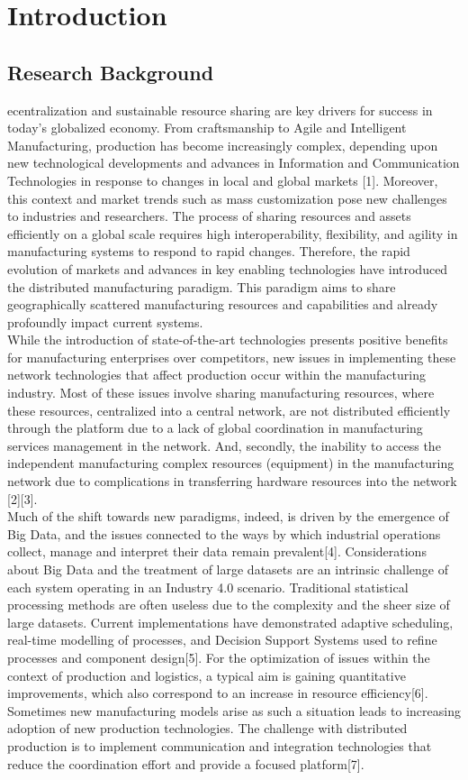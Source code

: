 \chapter*{Introduction}

\section{Research Background}
ecentralization and sustainable resource sharing are key drivers for success in today’s globalized economy. From craftsmanship to Agile and Intelligent Manufacturing, production has become increasingly complex, depending upon new technological developments and advances in Information and Communication Technologies in response to changes in local and global markets [1]. Moreover, this context and market trends such as mass customization pose new challenges to industries and researchers. The process of sharing resources and assets efficiently on a global scale requires high interoperability, flexibility, and agility in manufacturing systems to respond to rapid changes. Therefore, the rapid evolution of markets and advances in key enabling technologies have introduced the distributed manufacturing paradigm. This paradigm aims to share geographically scattered manufacturing resources and capabilities and already profoundly impact current systems.\\
While the introduction of state-of-the-art technologies presents positive benefits for manufacturing enterprises over competitors, new issues in implementing these network technologies that affect production occur within the manufacturing industry. Most of these issues involve sharing manufacturing resources, where these resources, centralized into a central network, are not distributed efficiently through the platform due to a lack of global coordination in manufacturing services management in the network. And, secondly, the inability to access the independent manufacturing complex resources (equipment) in the manufacturing network due to complications in transferring hardware resources into the network [2][3].\\
Much of the shift towards new paradigms, indeed, is driven by the emergence of Big Data, and the issues connected to the ways by which industrial operations collect, manage and interpret their data remain prevalent[4]. Considerations about Big Data and the treatment of large datasets are an intrinsic challenge of each system operating in an Industry 4.0 scenario. Traditional statistical processing methods are often useless due to the complexity and the sheer size of large datasets. Current implementations have demonstrated adaptive scheduling, real-time modelling of processes, and Decision Support Systems used to refine processes and component design[5]. For the optimization of issues within the context of production and logistics, a typical aim is gaining quantitative improvements, which also correspond to an increase in resource efficiency[6]. Sometimes new manufacturing models arise as such a situation leads to increasing adoption of new production technologies. The challenge with distributed production is to implement communication and integration technologies that reduce the coordination effort and provide a focused platform[7].\\
